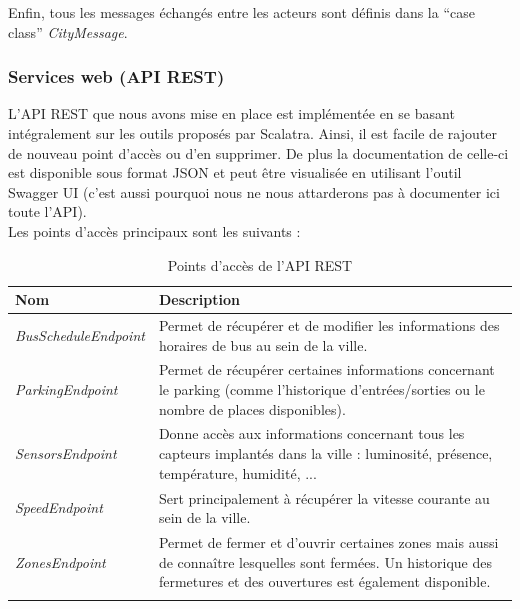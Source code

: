 Enfin, tous les messages échangés entre les acteurs sont définis dans la “case class” \emph{CityMessage}.


\subsubsection{Services web (API REST)}
L’API REST que nous avons mise en place est implémentée en se basant intégralement sur les outils proposés par Scalatra. Ainsi, il est facile de rajouter de nouveau point d’accès ou d’en supprimer. De plus la documentation de celle-ci est disponible sous format JSON et peut être visualisée en utilisant l’outil Swagger UI (c’est aussi pourquoi nous ne nous attarderons pas à documenter ici toute l’API).\\

Les points d’accès principaux sont les suivants :
\begin{center}
{\renewcommand{\arraystretch}{1.5}
\begin{longtable}{| p{} | p{} |}
    \hline
    \textbf{Nom} & \textbf{Description}\\
    \hline
    \emph{BusScheduleEndpoint} & Permet de récupérer et de modifier les informations des horaires de bus au sein de la ville.\\
    \hline
    \emph{ParkingEndpoint} & Permet de récupérer certaines informations concernant le parking (comme l’historique d’entrées/sorties ou le nombre de places disponibles).\\
    \hline
    \emph{SensorsEndpoint} & Donne accès aux informations concernant tous les capteurs implantés dans la ville : luminosité, présence, température, humidité, ...\\
    \hline
    \emph{SpeedEndpoint} & Sert principalement à récupérer la vitesse courante au sein de la ville.\\
    \hline
    \emph{ZonesEndpoint} & Permet de fermer et d’ouvrir certaines zones mais aussi de connaître lesquelles sont fermées. Un historique des fermetures et des ouvertures est également disponible.\\
    \hline
    \caption{Points d'accès de l'API REST}
\end{longtable}}
\end{center}
\vspace{-1cm}

